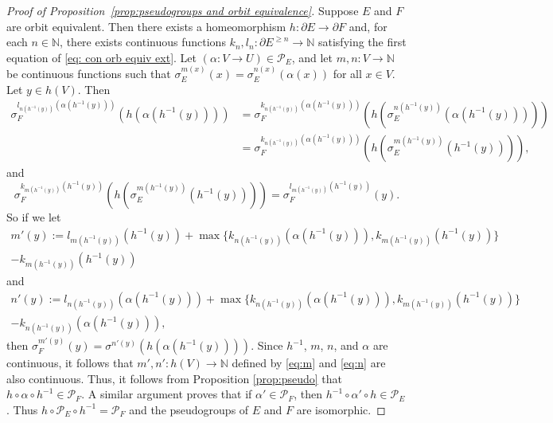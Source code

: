 \documentclass[12pt, a4paper]{amsart}
\numberwithin{equation}{section}
\theoremstyle{definition}
\theoremstyle{remark}
\begin{document}
\begin{proof}[Proof of Proposition~\ref{prop:pseudogroups and orbit equivalence}]
	Suppose $E$ and $F$ are orbit equivalent. Then there exists a 
	homeomorphism $h:\partial E\to \partial F$ and, for each $n\in{\mathbb{N}}$, there 
	exists 
	continuous functions $k_n, l_n:\partial E^{\ge n}\to{\mathbb{N}}$ satisfying the 
	first equation of \eqref{eq: con orb equiv ext}. Let $(\alpha:V\to 
	U)\in\mathcal{P}_E$, and let $m,n:V\to{\mathbb{N}}$ be continuous functions such 
	that $\sigma_E^{m(x)}(x)=\sigma_E^{n(x)}(\alpha(x))$ for all $x\in V$. Let 
	$y\in h(V)$. Then 
	\begin{align*}
		\sigma_F^{l_{n(h^{-1}(y))}(\alpha(h^{-1}(y)))}(h(\alpha(h^{-1}(y))))
		&=\sigma_F^{k_{n(h^{-1}(y))}(\alpha(h^{-1}(y)))}(h(\sigma_E^{n(h^{-1}(y))}(\alpha(h^{-1}(y)))))\\
		&=\sigma_F^{k_{n(h^{-1}(y))}(\alpha(h^{-1}(y)))}(h(\sigma_E^{m(h^{-1}(y))}(h^{-1}(y)))),
	\end{align*}
	and
	\begin{equation*}
		\sigma_F^{k_{m(h^{-1}(y))}(h^{-1}(y))}(h(\sigma_E^{m(h^{-1}(y))}(h^{-1}(y))))=
		\sigma_F^{l_{m(h^{-1}(y))}(h^{-1}(y))}(y).
	\end{equation*}
	So if we let 
	\begin{multline}\label{eq:m}
		m'(y):=l_{m(h^{-1}(y))}(h^{-1}(y))+{\operatorname{max}}\{k_{n(h^{-1}(y))}(\alpha(h^{-1}(y))),k_{m(h^{-1}(y))}(h^{-1}(y))\}\\-k_{m(h^{-1}(y))}(h^{-1}(y))
	\end{multline}
	and
	\begin{multline}\label{eq:n}
		n'(y):=l_{n(h^{-1}(y))}(\alpha(h^{-1}(y)))+{\operatorname{max}}\{k_{n(h^{-1}(y))}(\alpha(h^{-1}(y))),k_{m(h^{-1}(y))}(h^{-1}(y))\}\\-k_{n(h^{-1}(y))}(\alpha(h^{-1}(y))),
	\end{multline}
	then $\sigma_F^{m'(y)}(y)=\sigma^{n'(y)}(h(\alpha(h^{-1}(y))))$. Since 
	$h^{-1}$, $m$, $n$, and $\alpha$ are continuous, it follows that 
	$m',n':h(V)\to{\mathbb{N}}$ defined by \eqref{eq:m} and \eqref{eq:n} are also 
	continuous. Thus, it follows from Proposition \ref{prop:pseudo} that 
	$h\circ\alpha\circ h^{-1}\in\mathcal{P}_F$. A similar argument proves that 
	if $\alpha'\in\mathcal{P}_F$, then $h^{-1}\circ\alpha'\circ 
	h\in\mathcal{P}_E$. Thus $h\circ\mathcal{P}_E\circ h^{-1}=\mathcal{P}_F$ 
	and the pseudogroups of $E$ and $F$ are isomorphic.


\end{proof}
\end{document}
